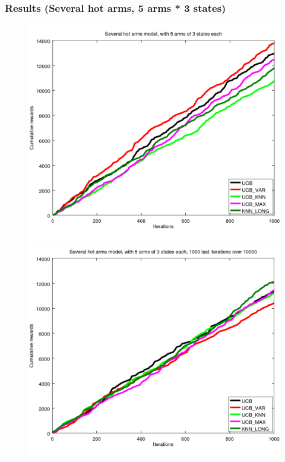 \documentclass[french]{beamer}
\begin{document}
\begin{frame}
	\frametitle{Results (Several hot arms, 5 arms * 3 states)}

	\begin{figure}[h]
		\begin{minipage}[b]{.49\linewidth}
			\includegraphics[width=1.0\textwidth]{begin_ms_1000it.png}

		\end{minipage}
		\hfill
		\begin{minipage}[b]{0.49\linewidth}
			\includegraphics[width=1.0\textwidth]{last_ms_1000it.png}

		\end{minipage}
		\label{fig:f}
	\end{figure}

\end{frame}
\end{document}
